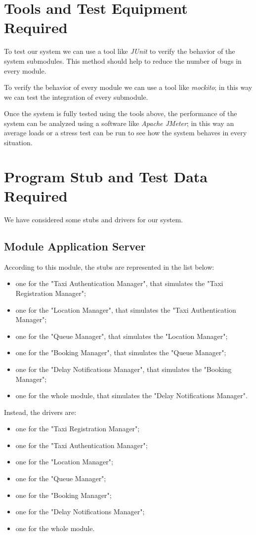 \section{Tools and Test Equipment Required}
	To test our system we can use a tool like \textit{JUnit} to verify the behavior of the system submodules. This method should help to reduce the number of bugs in every module.
	
	To verify the behavior of every module we can use a tool like \textit{mockito}; in this way we can test the integration of every submodule.
	
	Once the system is fully tested using the tools above, the performance of the system can be analyzed using a software like \textit{Apache JMeter}; in this way an average loads or a stress test can be run to see how the system behaves in every situation.
\section{Program Stub and Test Data Required}
	We have considered some stubs and drivers for our system.
	\subsection{Module Application Server}
		According to this module, the stubs are represented in the list below:
		\begin{itemize}
			\item one for the "Taxi Authentication Manager", that simulates the "Taxi Registration Manager";
			\item one for the "Location Manager", that simulates the "Taxi Authentication Manager"; 
			\item one for the "Queue Manager", that simulates the "Location Manager";
			\item one for the "Booking Manager", that simulates the "Queue Manager";
			\item one for the "Delay Notifications Manager", that simulates the "Booking Manager";
			\item one for the whole module, that simulates the "Delay Notifications Manager".
		\end{itemize}
		
		Instead, the drivers are:
		\begin{itemize}
			\item one for the "Taxi Registration Manager";
			\item one for the "Taxi Authentication Manager";
			\item one for the "Location Manager";
			\item one for the "Queue Manager";
			\item one for the "Booking Manager";
			\item one for the "Delay Notifications Manager";
			\item one for the whole module.
		\end{itemize}
	
